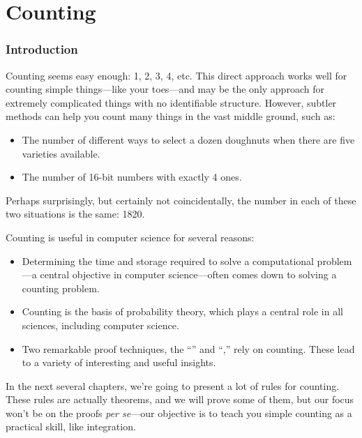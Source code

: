 \part{Counting}
\label{part:counting}

\clearpage

\section*{Introduction}

Counting seems easy enough: 1, 2, 3, 4, etc.  This direct approach
works well for counting simple things---like your toes---and may be
the only approach for extremely complicated things with no
identifiable structure.  However, subtler methods can help you count
many things in the vast middle ground, such as:
\begin{itemize}

\item The number of different ways to select a dozen doughnuts when
there are five varieties available.

\item The number of 16-bit numbers with exactly 4 ones.

\end{itemize}
Perhaps surprisingly, but certainly not coincidentally, the number in
each of these two situations is the same: 1820.

Counting is useful in computer science for several reasons:
\begin{itemize}

\item

Determining the time and storage required to solve a computational
problem---a central objective in computer science---often comes down
to solving a counting problem.

\item

Counting is the basis of probability theory, which plays a central
role in all sciences, including computer science.

\item

Two remarkable proof techniques, the ``''
and ``,'' rely on counting.  These lead to a
variety of interesting and useful insights.

\end{itemize}

In the next several chapters, we're going to present a lot of rules
for counting.  These rules are actually theorems, and we will prove
some of them, but our focus won't be on the proofs \emph{per se}---our
objective is to teach you simple counting as a practical skill, like
integration.

